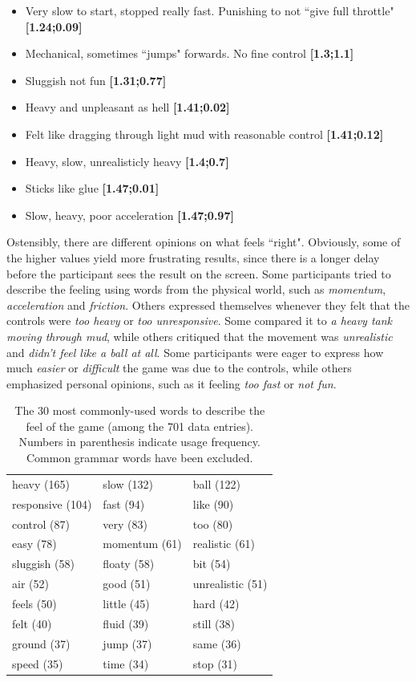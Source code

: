 \begin{itemize}[noitemsep,nolistsep]
\item Very slow to start, stopped really fast. Punishing to not ``give full throttle" \textbf{[1.24;0.09]}
\item Mechanical, sometimes ``jumps" forwards. No fine control \textbf{[1.3;1.1]}
\item Sluggish not fun \textbf{[1.31;0.77]}
\item Heavy and unpleasant as hell \textbf{[1.41;0.02]}
\item Felt like dragging through light mud with reasonable control \textbf{[1.41;0.12]}
\item Heavy, slow, unrealisticly heavy \textbf{[1.4;0.7]}
\item Sticks like glue \textbf{[1.47;0.01]}
\item Slow, heavy, poor acceleration \textbf{[1.47;0.97]}
\end{itemize}

Ostensibly, there are different opinions on what feels ``right". Obviously, some of the higher values yield more frustrating results, since there is a longer delay before the participant sees the result on the screen. Some participants tried to describe the feeling using words from the physical world, such as \textit{momentum}, \textit{acceleration} and \textit{friction}. Others expressed themselves whenever they felt that the controls were \textit{too heavy} or \textit{too unresponsive}. Some compared it to \textit{a heavy tank moving through mud}, while others critiqued that the movement was \textit{unrealistic} and \textit{didn't feel like a ball at all}. Some participants were eager to express how much \textit{easier} or \textit{difficult} the game was due to the controls, while others emphasized personal opinions, such as it feeling \textit{too fast} or \textit{not fun}.

\begin{table} \centering
\caption{The 30 most commonly-used words to describe the feel of the game (among the 701 data entries). Numbers in parenthesis indicate usage frequency. Common grammar words have been excluded.}
\label{table:mostWords}
\begin{tabular}{lll}
\toprule
heavy (165) & slow (132) & ball (122)\\
responsive (104) & fast (94) & like (90)\\
control (87) & very (83) & too (80)\\ 
easy (78) & momentum (61) & realistic (61)\\
sluggish (58) & floaty (58) & bit (54)\\
air  (52) & good (51) & unrealistic (51)\\
feels (50) & little (45) & hard (42)\\
felt (40) & fluid (39) & still (38)\\
ground (37) & jump (37) & same (36)\\
speed (35) & time (34) & stop (31)\\
\bottomrule
\end{tabular}
\end{table}

